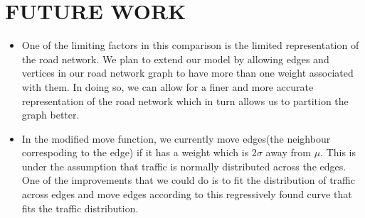 \section{FUTURE WORK}
\label{sec:futu}

\begin{itemize}
\item One of the limiting factors in this comparison is the limited representation of the road network. We plan to extend our model by allowing edges and vertices in our road network graph to have more than one weight associated with them. In doing so, we can allow for a finer and more accurate representation of the road network which in turn allows us to partition the graph better.
\item In the modified move function, we currently move edges(the neighbour correspoding to the edge) if it has a weight which is 2$\sigma$ away from $\mu$. This is under the assumption that traffic is normally distributed across the edges. One of the improvements that we could do is to fit the distribution of traffic across edges and move edges according to this regressively found curve that fits the traffic distribution.
\end{itemize}